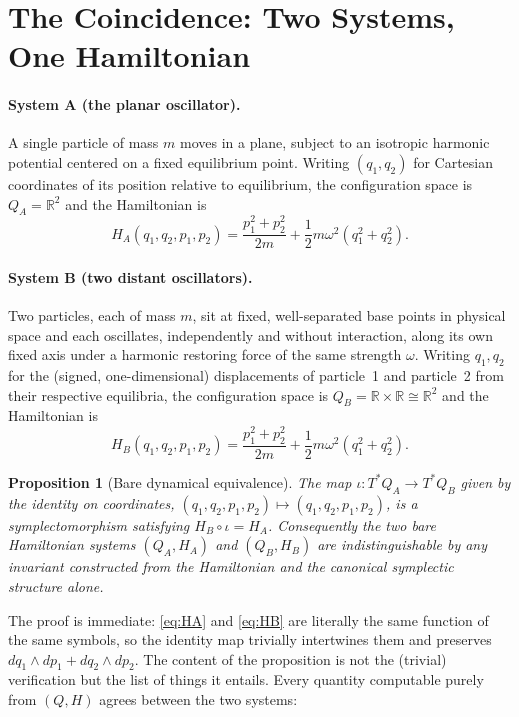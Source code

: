 \documentclass[11pt]{article}
\newtheorem{proposition}{Proposition}
\begin{document}
\section{The Coincidence: Two Systems, One Hamiltonian}

\paragraph{System A (the planar oscillator).} A single particle of mass $m$ moves in a plane, subject to an isotropic harmonic potential centered on a fixed equilibrium point. Writing $(q_1,q_2)$ for Cartesian coordinates of its position relative to equilibrium, the configuration space is $Q_A=\mathbb{R}^2$ and the Hamiltonian is
\begin{equation}
H_A(q_1,q_2,p_1,p_2)=\frac{p_1^2+p_2^2}{2m}+\frac{1}{2}m\omega^2\left(q_1^2+q_2^2\right).
\label{eq:HA}
\end{equation}

\paragraph{System B (two distant oscillators).} Two particles, each of mass $m$, sit at fixed, well-separated base points in physical space and each oscillates, independently and without interaction, along its own fixed axis under a harmonic restoring force of the same strength $\omega$. Writing $q_1,q_2$ for the (signed, one-dimensional) displacements of particle~1 and particle~2 from their respective equilibria, the configuration space is $Q_B=\mathbb{R}\times\mathbb{R}\cong\mathbb{R}^2$ and the Hamiltonian is
\begin{equation}
H_B(q_1,q_2,p_1,p_2)=\frac{p_1^2+p_2^2}{2m}+\frac{1}{2}m\omega^2\left(q_1^2+q_2^2\right).
\label{eq:HB}
\end{equation}

\begin{proposition}[Bare dynamical equivalence]
The map $\iota:T^*Q_A\to T^*Q_B$ given by the identity on coordinates, $(q_1,q_2,p_1,p_2)\mapsto(q_1,q_2,p_1,p_2)$, is a symplectomorphism satisfying $H_B\circ\iota = H_A$. Consequently the two bare Hamiltonian systems $(Q_A,H_A)$ and $(Q_B,H_B)$ are indistinguishable by any invariant constructed from the Hamiltonian and the canonical symplectic structure alone.
\end{proposition}

The proof is immediate: \eqref{eq:HA} and \eqref{eq:HB} are literally the same function of the same symbols, so the identity map trivially intertwines them and preserves $dq_1\wedge dp_1+dq_2\wedge dp_2$. The content of the proposition is not the (trivial) verification but the list of things it entails. Every quantity computable purely from $(Q,H)$ agrees between the two systems:
\end{document}
